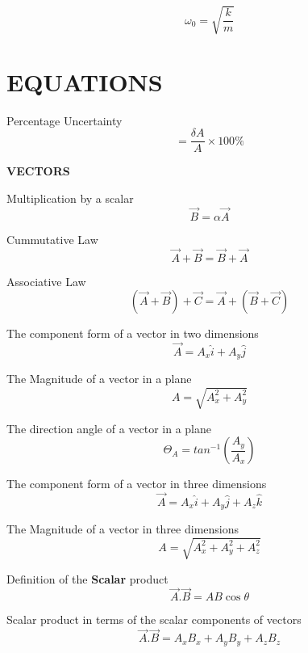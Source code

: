 \documentclass[12pt, letterpaper, twoside]{article}
\begin{document}
\begin{equation}
\omega_0 = \sqrt{\frac{k}{m}}
\end{equation}
















\newpage

\section{EQUATIONS}

Percentage Uncertainty 
$$=\frac{\delta A}{A} \times 100\%$$

\vfil


\textbf{VECTORS}
$$  $$

Multiplication by a scalar
$$\overrightarrow{B}=\alpha \overrightarrow{A}$$


Cummutative Law
$$\overrightarrow{A} +\overrightarrow{B} = \overrightarrow{B} + \overrightarrow{A}$$ 


Associative Law
$$(\overrightarrow{A} + \overrightarrow{B}) + \overrightarrow{C} = \overrightarrow{A} + (\overrightarrow{B} + \overrightarrow{C})$$



The component form of a vector in two dimensions
$$\overrightarrow{A} = A_x \hat{i} + A_y \hat{j}$$




The Magnitude of a vector in a plane
$$A = \sqrt{A_x^2 + A_y^2}$$



The direction angle of a vector in a plane
$$\Theta_A = tan^{-1} \left( \frac{A_y}{A_x} \right)$$




The component form of a vector in three dimensions
$$\overrightarrow{A} = A_x \hat{i} + A_y \hat{j} + A_z \hat{k}$$


The Magnitude of a vector in three dimensions
$$A = \sqrt{A_x^2 + A_y^2 + A_z^2}$$



Definition of the \textbf{Scalar} product
$$\overrightarrow{A} . \overrightarrow{B}= AB \cos \theta$$


Scalar product in terms of the scalar components of vectors
$$\overrightarrow{A} . \overrightarrow{B}= A_x B_x + A_y B_y + A_z B_z$$
\end{document}
